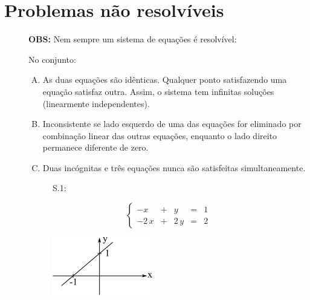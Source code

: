 \section{Problemas não resolvíveis}

\begin{description}

\item[] \textbf{OBS:} Nem sempre um sistema de equações é resolvível:

\item[] No conjunto:

\begin{enumerate}[S.1:]

\item As duas equações são idênticas. Qualquer ponto satisfazendo uma equação satisfaz outra. Assim, o sistema tem infinitas soluções (linearmente independentes).

\item Inconsistente se lado esquerdo de uma das equações for eliminado por combinação linear das outras equações, enquanto o lado direito permanece diferente de zero.

\item Duas incógnitas e três equações nunca são satisfeitas simultaneamente.

\end{enumerate}

\begin{figure}[!ht]
 \centering
 \begin{minipage}[c]{0.8cm}
 S.1:
 \end{minipage}
 \begin{minipage}[c]{3cm}
    \[
     \left\{ \begin{array}{rrrrr}
      -x & + & y & = & 1 \\
      -2\,x & + & 2\,y & = & 2
     \end{array} \right.
    \]
 \end{minipage}\hspace*{2cm}
 \begin{minipage}[c]{5cm}
    \includegraphics[scale=0.8]{capitulos/capitulo4/figuras/prob_nao_resol1.png}
    \label{fig:prob_nao_resol1}
 \end{minipage}
\end{figure}


\end{description}
